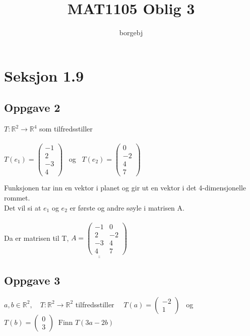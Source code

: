 \documentclass{article}
\title{MAT1105 Oblig 3}
\author{borgebj}
\date{}
\begin{document}
\maketitle

\section*{Seksjon 1.9}

\subsection*{Oppgave 2}

\(T : \mathbb{R}^2 \rightarrow \mathbb{R}^4\) som tilfredsstiller\\ \\
\(T(e_1) = \begin{pmatrix}
    -1 \\ 2 \\ -3 \\ 4
\end{pmatrix}\) \ og \ \(T(e_2) = \begin{pmatrix}
    0 \\ -2 \\ 4 \\ 7
\end{pmatrix}\)

Funksjonen tar inn en vektor i planet og gir ut en vektor i det 4-dimensjonelle rommet. \\
Det vil si at $e_1$ og $e_2$ er første og andre søyle i matrisen A.\\ \\
Da er matrisen til T, \quad \(\underline{\underline{A = 
\begin{pmatrix}
    -1 & 0 \\ 2 & -2 \\ -3 & 4 \\ 4 & 7
\end{pmatrix}}}\)

\newpage

\subsection*{Oppgave 3}
\(a, b \in \mathbb{R}^2, \quad T : \mathbb{R}^2 \rightarrow \mathbb{R}^2\) tilfredsstiller \(\quad 
T(a) = \begin{pmatrix}
    -2 \\ 1
\end{pmatrix}\) \ og \ 
\(T(b) = \begin{pmatrix}
    0 \\ 3
\end{pmatrix} \ \text{ Finn } T(3a-2b)\)
\end{document}
